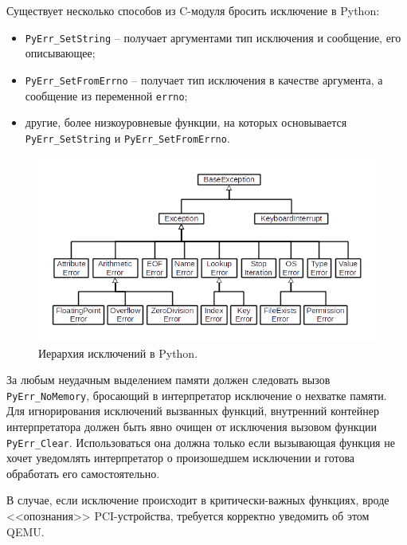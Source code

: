 Существует несколько способов из C-модуля бросить исключение в Python:
\begin{itemize}
    \item \texttt{PyErr\_SetString} -- получает аргументами тип исключения
        и сообщение, его описывающее;
    \item \texttt{PyErr\_SetFromErrno} -- получает тип исключения в качестве
        аргумента, а сообщение из переменной \texttt{errno};
    \item другие, более низкоуровневые функции, на которых основывается
        \texttt{PyErr\_SetString} и \texttt{PyErr\_SetFromErrno}.
\end{itemize}

\begin{figure}[!htbp]
    \centering
    \begin{adjustbox}{max totalsize={0.8\textwidth}{\textheight}}
        \includegraphics[scale=1.5]{images/python_exception_hierarchy.png}
    \end{adjustbox}
    \caption{Иерархия исключений в Python.}\label{fig:python-exception-hierarchy}
\end{figure}

За любым неудачным выделением памяти должен следовать вызов \texttt{PyErr\_NoMemory},
бросающий в интерпретатор исключение о нехватке памяти.
Для игнорирования исключений вызванных функций, внутренний контейнер интерпретатора должен
быть явно очищен от исключения вызовом функции \texttt{PyErr\_Clear}.
Использоваться она должна только если вызывающая функция не хочет уведомлять интерпретатор
о произошедшем исключении и готова обработать его самостоятельно.

В случае, если исключение происходит в критически-важных функциях, вроде <<опознания>>
PCI-устройства, требуется корректно уведомить об этом QEMU.

